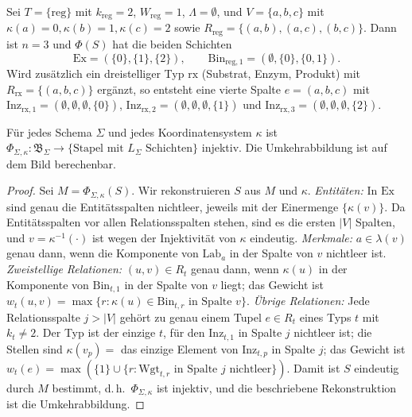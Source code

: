 \begin{beispiel}
	Sei $T=\{\mathrm{reg}\}$ mit $k_{\mathrm{reg}}=2$, $W_{\mathrm{reg}}=1$, $\Lambda=\emptyset$, und $V=\{a,b,c\}$ mit $\kappa(a)=0,\kappa(b)=1,\kappa(c)=2$ sowie $R_{\mathrm{reg}}=\{(a,b),(a,c),(b,c)\}$. Dann ist $n=3$ und $\Phi(S)$ hat die beiden Schichten
	\[
	\mathrm{Ex}=(\{0\},\{1\},\{2\}),\qquad \mathrm{Bin}_{\mathrm{reg},1}=(\emptyset,\{0\},\{0,1\}).
	\]
	Wird zusätzlich ein dreistelliger Typ $\mathrm{rx}$ (Substrat, Enzym, Produkt) mit $R_{\mathrm{rx}}=\{(a,b,c)\}$ ergänzt, so entsteht eine vierte Spalte $e=(a,b,c)$ mit $\mathrm{Inz}_{\mathrm{rx},1}=(\emptyset,\emptyset,\emptyset,\{0\})$, $\mathrm{Inz}_{\mathrm{rx},2}=(\emptyset,\emptyset,\emptyset,\{1\})$ und $\mathrm{Inz}_{\mathrm{rx},3}=(\emptyset,\emptyset,\emptyset,\{2\})$.
\end{beispiel}

\begin{satz}
	\label{satz:univ_verlustfrei}
	Für jedes Schema $\Sigma$ und jedes Koordinatensystem $\kappa$ ist $\Phi_{\Sigma,\kappa}:\mathfrak{B}_\Sigma\to\{\text{Stapel mit }L_\Sigma\text{ Schichten}\}$ injektiv. Die Umkehrabbildung ist auf dem Bild berechenbar.
\end{satz}

\begin{proof}
	Sei $M=\Phi_{\Sigma,\kappa}(S)$. Wir rekonstruieren $S$ aus $M$ und $\kappa$.
	\emph{Entitäten:} In $\mathrm{Ex}$ sind genau die Entitätsspalten nichtleer, jeweils mit der Einermenge $\{\kappa(v)\}$. Da Entitätsspalten vor allen Relationsspalten stehen, sind es die ersten $|V|$ Spalten, und $v=\kappa^{-1}(\cdot)$ ist wegen der Injektivität von $\kappa$ eindeutig.
	\emph{Merkmale:} $a\in\lambda(v)$ genau dann, wenn die Komponente von $\mathrm{Lab}_a$ in der Spalte von $v$ nichtleer ist.
	\emph{Zweistellige Relationen:} $(u,v)\in R_t$ genau dann, wenn $\kappa(u)$ in der Komponente von $\mathrm{Bin}_{t,1}$ in der Spalte von $v$ liegt; das Gewicht ist $w_t(u,v)=\max\{r : \kappa(u)\in \mathrm{Bin}_{t,r}\text{ in Spalte }v\}$.
	\emph{Übrige Relationen:} Jede Relationsspalte $j>|V|$ gehört zu genau einem Tupel $e\in R_t$ eines Typs $t$ mit $k_t\ne2$. Der Typ ist der einzige $t$, für den $\mathrm{Inz}_{t,1}$ in Spalte $j$ nichtleer ist; die Stellen sind $\kappa(v_p)=$ das einzige Element von $\mathrm{Inz}_{t,p}$ in Spalte $j$; das Gewicht ist $w_t(e)=\max(\{1\}\cup\{r : \mathrm{Wgt}_{t,r}\text{ in Spalte }j\text{ nichtleer}\})$.
	Damit ist $S$ eindeutig durch $M$ bestimmt, d.\,h.\ $\Phi_{\Sigma,\kappa}$ ist injektiv, und die beschriebene Rekonstruktion ist die Umkehrabbildung.
\end{proof}

